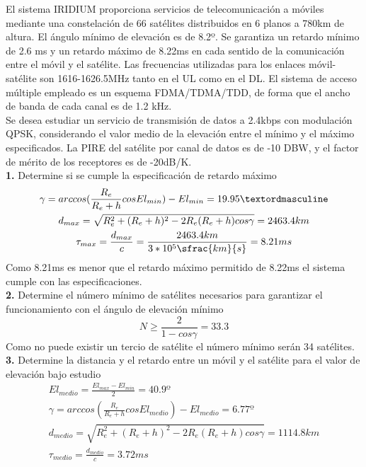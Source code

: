 \begin{exercise}[4]
	El sistema IRIDIUM proporciona servicios de telecomunicación a móviles mediante una constelación de 66 satélites distribuidos en 6 planos a 780km de altura. El ángulo mínimo de elevación es de 8.2º. Se garantiza un retardo mínimo de 2.6 ms y un retardo máximo de 8.22ms en cada sentido de la comunicación entre el móvil y el satélite. Las frecuencias utilizadas para los enlaces móvil-satélite son 1616-1626.5MHz tanto en el UL como en el DL. El sistema de acceso múltiple empleado es un esquema FDMA/TDMA/TDD, de forma que el ancho de banda de cada canal es de 1.2 kHz.\\
	Se desea estudiar un servicio de transmisión de datos a 2.4kbps con modulación QPSK, considerando el valor medio de la elevación entre el mínimo y el máximo especificados. La PIRE del satélite por canal de datos es de -10 DBW, y el factor de mérito de los receptores es de -20dB/K.\\
	\textbf{1.} Determine si se cumple la especificación de retardo máximo\\
	\begin{gather*}
		\gamma=arccos(\frac{R_e}{R_e+h}cosEl_{min})-El_{min}=19.95º\\
		d_{max}=\sqrt{R_e^2+(R_e+h)^2-2R_e(R_e+h)cos\gamma}=2463.4km\\
		\tau_{max}=\frac{d_{max}}{c}=\frac{2463.4km}{3*10^5\sfrac{km}{s}}=8.21ms
	\end{gather*}
Como 8.21ms es menor que el retardo máximo permitido de 8.22ms el sistema cumple con las especificaciones.\\
	\textbf{2.} Determine el número mínimo de satélites necesarios para garantizar el funcionamiento con el ángulo de elevación mínimo\\
	\[N\geq \frac{2}{1-cos\gamma}=33.3\]
	Como no puede existir un tercio de satélite el número mínimo serán 34 satélites.\\
	\textbf{3.} Determine la distancia y el retardo entre un móvil y el satélite para el valor de elevación bajo estudio\\
	\begin{gather*}
		El_{medio}=\frac{El_{max}-El_{min}}{2}=40.9º\\
		\gamma=arccos(\frac{R_e}{R_e+h}cosEl_{medio})-El_{medio}=6.77º\\
		d_{medio}=\sqrt{R_e^2+(R_e+h)^2-2R_e(R_e+h)cos\gamma}=1114.8km\\
		\tau_{medio}=\frac{d_{medio}}{c}=3.72ms
	\end{gather*}

\end{exercise}
